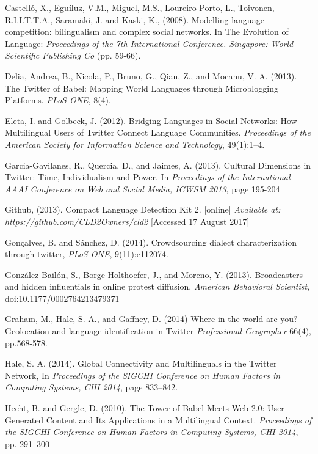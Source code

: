 \documentclass[12pt]{article}
\begin{document}
\begin{thebibliography}{9}

Castell\'o, X., Egu\'iluz, V.M., Miguel, M.S., Loureiro-Porto, L., Toivonen, R.I.I.T.T.A., Saram\"aki, J. and Kaski, K., (2008). Modelling language competition: bilingualism and complex social networks. In The Evolution of Language: \textit{Proceedings of the 7th International Conference. Singapore: World Scientific Publishing Co} (pp. 59-66).


Delia, Andrea, B., Nicola, P., Bruno, G., Qian, Z., and Mocanu, V. A. (2013). The Twitter of Babel: Mapping World Languages through Microblogging Platforms. \textit{PLoS ONE}, 8(4).

Eleta, I. and Golbeck, J. (2012). Bridging Languages in Social Networks: How Multilingual Users of Twitter Connect Language Communities. \textit{Proceedings of the American Society for Information Science and Technology}, 49(1):1–4.

Garcia-Gavilanes, R., Quercia, D., and Jaimes, A. (2013). Cultural Dimensions in Twitter: Time, Individualism and Power. In \textit{Proceedings of the International AAAI Conference on Web and Social Media, ICWSM 2013}, page 195-204


Github, (2013). Compact Language Detection Kit 2. [online] \textit{ Available at: https://github.com/CLD2Owners/cld2 } [Accessed 17 August 2017]



Gon\c calves, B. and S\'anchez, D. (2014). Crowdsourcing dialect characterization through twitter, \textit{PLoS ONE}, 9(11):e112074.

Gonz\'alez-Bail\'on, S., Borge-Holthoefer, J., and Moreno, Y. (2013). Broadcasters and hidden influentials in
online protest diffusion, \textit{American Behavioral Scientist}, doi:10.1177/0002764213479371

Graham, M., Hale, S. A., and Gaffney, D. (2014)
Where in the world are you? Geolocation and language identification in Twitter \textit{Professional Geographer} 66(4), pp.568-578.

Hale, S. A. (2014). Global Connectivity and Multilinguals in the Twitter Network, In \textit{Proceedings of the SIGCHI Conference on Human Factors in Computing Systems, CHI 2014}, page 833–842.

Hecht, B. and Gergle, D. (2010). The Tower of Babel Meets Web 2.0: User-Generated Content and Its Applications in a Multilingual Context. \textit{Proceedings of the SIGCHI Conference on Human Factors in Computing Systems, CHI 2014}, pp. 291–300


\end{thebibliography}
\end{document}
